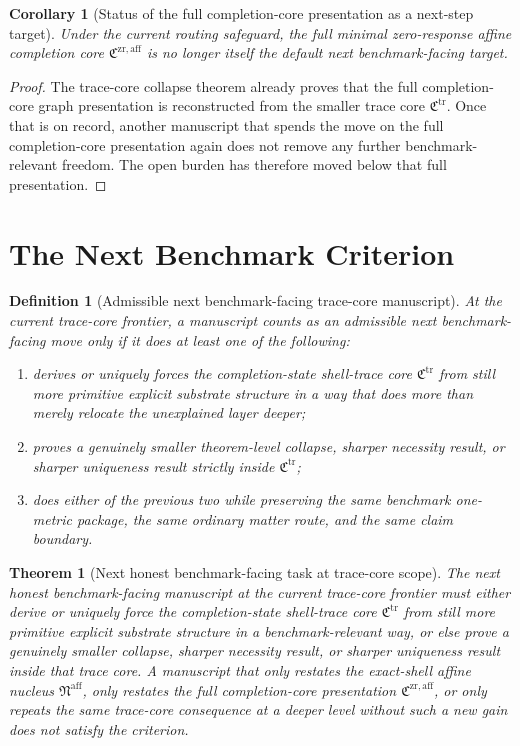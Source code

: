 \documentclass[11pt]{article}
\newcommand{\CompletionCore}{\mathfrak C^{\mathrm{zr,aff}}}
\newcommand{\TraceCore}{\mathfrak C^{\mathrm{tr}}}
\newcommand{\AffineNucleus}{\mathfrak N^{\mathrm{aff}}}
\newtheorem{definition}{Definition}
\newtheorem{corollary}{Corollary}
\newtheorem{theorem}{Theorem}
\begin{document}
\begin{corollary}[Status of the full completion-core presentation as a next-step target]
Under the current routing safeguard, the full minimal zero-response affine completion core \(\CompletionCore\) is no longer itself the default next benchmark-facing target.
\end{corollary}

\begin{proof}
The trace-core collapse theorem already proves that the full completion-core graph presentation is reconstructed from the smaller trace core \(\TraceCore\). Once that is on record, another manuscript that spends the move on the full completion-core presentation again does not remove any further benchmark-relevant freedom. The open burden has therefore moved below that full presentation.
\end{proof}

\section{The Next Benchmark Criterion}

\begin{definition}[Admissible next benchmark-facing trace-core manuscript]
At the current trace-core frontier, a manuscript counts as an admissible next benchmark-facing move only if it does at least one of the following:
\begin{enumerate}
    \item derives or uniquely forces the completion-state shell-trace core \(\TraceCore\) from still more primitive explicit substrate structure in a way that does more than merely relocate the unexplained layer deeper;
    \item proves a genuinely smaller theorem-level collapse, sharper necessity result, or sharper uniqueness result strictly inside \(\TraceCore\);
    \item does either of the previous two while preserving the same benchmark one-metric package, the same ordinary matter route, and the same claim boundary.
\end{enumerate}
\end{definition}

\begin{theorem}[Next honest benchmark-facing task at trace-core scope]
The next honest benchmark-facing manuscript at the current trace-core frontier must either derive or uniquely force the completion-state shell-trace core \(\TraceCore\) from still more primitive explicit substrate structure in a benchmark-relevant way, or else prove a genuinely smaller collapse, sharper necessity result, or sharper uniqueness result inside that trace core. A manuscript that only restates the exact-shell affine nucleus \(\AffineNucleus\), only restates the full completion-core presentation \(\CompletionCore\), or only repeats the same trace-core consequence at a deeper level without such a new gain does not satisfy the criterion.
\end{theorem}
\end{document}
